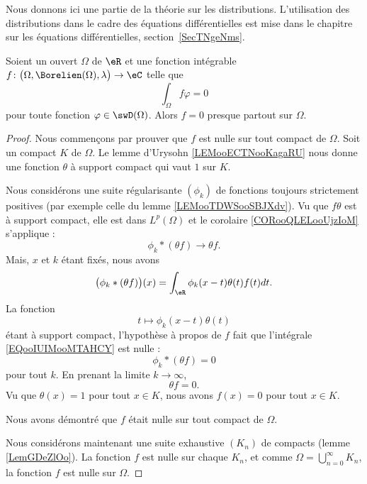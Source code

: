 
Nous donnons ici une partie de la théorie sur les distributions. L'utilisation des distributions dans le cadre des équations différentielles est mise dans le chapitre sur les équations différentielles, section~\ref{SecTNgeNms}.

\begin{proposition} \label{PropAAjSURG}
	Soient un ouvert \( \Omega\) de \( \eR\) et une fonction intégrable \( f\colon \big( \Omega,\Borelien(\Omega),\lambda \big)\to \eC\) telle que
	\begin{equation}
		\int_{\Omega}f\varphi=0
	\end{equation}
	pour toute fonction \( \varphi\in\swD(\Omega)\). Alors \( f=0\) presque partout sur \( \Omega\).
\end{proposition}

\begin{proof}
	Nous commençons par prouver que \( f\) est nulle sur tout compact de \( \Omega\). Soit un compact \( K\) de \( \Omega\). Le lemme d'Urysohn \ref{LEMooECTNooKagaRU} nous donne une fonction \( \theta\) à support compact qui vaut \( 1\) sur \( K\).

	Nous considérons une suite régularisante \( (\phi_k)\) de fonctions toujours strictement positives (par exemple celle du lemme \ref{LEMooTDWSooSBJXdv}). Vu que \( f\theta\) est à support compact, elle est dans \( L^p(\Omega)\) et le corolaire \ref{CORooQLELooUjzIoM} s'applique :
	\begin{equation}
		\phi_k*(\theta f)\to \theta f.
	\end{equation}
	Mais, \( x\) et \( k\) étant fixés, nous avons
	\begin{equation}        \label{EQooIUIMooMTAHCY}
		\big( \phi_k* (\theta f) \big)(x)=\int_{\eR}\phi_k(x-t)\theta(t)f(t)dt.
	\end{equation}
	La fonction
	\begin{equation}
		t\mapsto \phi_k(x-t)\theta(t)
	\end{equation}
	étant à support compact, l'hypothèse à propos de \( f\) fait que l'intégrale \eqref{EQooIUIMooMTAHCY} est nulle :
	\begin{equation}
		\phi_k*(\theta f)=0
	\end{equation}
	pour tout \( k\). En prenant la limite \( k\to \infty\),
	\begin{equation}
		\theta f=0.
	\end{equation}
	Vu que \( \theta(x)=1\) pour tout \( x\in K\), nous avons \( f(x)=0\) pour tout \( x\in K\).

	Nous avons démontré que \( f\) était nulle sur tout compact de \( \Omega\).

	Nous considérons maintenant une suite exhaustive \( (K_n)\) de compacts (lemme \ref{LemGDeZlOo}). La fonction \( f\) est nulle sur chaque \( K_n\), et comme \( \Omega=\bigcup_{n=0}^{\infty}K_n\), la fonction \( f\) est nulle sur \( \Omega\).
\end{proof}

